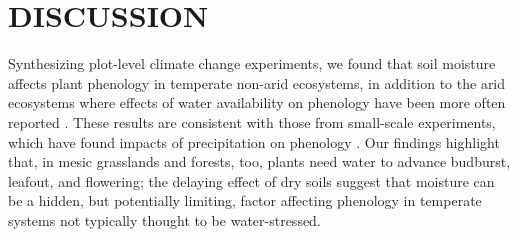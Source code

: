 \documentclass{article}
\begin{document}
\section* {DISCUSSION}
\par Synthesizing plot-level climate change experiments, we found that soil moisture affects plant phenology in temperate non-arid ecosystems, in addition to the arid ecosystems where effects of water availability on phenology have been more often reported \cite[e.g.,][]{reich1984,van1993,cleverly2016soil,bertiller1991seasonal}. %
These results are consistent with those from small-scale experiments, which have found impacts of precipitation on phenology \cite[e.g.,][]{currier2022precipitation}. Our findings highlight that, in mesic grasslands and forests, too, plants need water to advance budburst, leafout, and flowering; the delaying effect of dry soils suggest that moisture can be a hidden, but potentially limiting, factor affecting phenology in temperate systems not typically thought to be water-stressed. 
\end{document}
